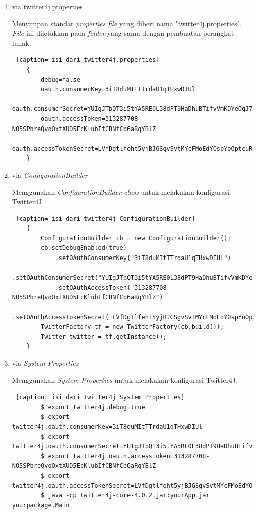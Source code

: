 \begin{enumerate}
	\item via twitter4j.properties
	
	Menyimpan standar \textit{properties} \textit{file} yang diberi nama "twitter4j.properties". \textit{File} ini diletakkan pada \textit{folder} yang sama dengan pembuatan perangkat lunak.
	\begin{lstlisting} [caption= isi dari twitter4j.properties]
	{
		debug=false
		oauth.consumerKey=3iT8duMItTTrdaU1qTHxwDIUl
		oauth.consumerSecret=YUIgJTbQT3i5tYA5RE0L38dPT9HaDhuBTifvVmKDYeOgJ7t313
		oauth.accessToken=313287708-NO5SPbreQvoOxtXUD5EcKlubIfCBNfCb6aRqYBlZ
		oauth.accessTokenSecret=LVfDgtlfeht5yjBJGSgvSvtMYcFMoEdYOspYoOptcuR4i
	}
	\end{lstlisting}
	\item via \textit{ConfigurationBuilder}
	
	Menggunakan \textit{ConfigurationBuilder class} untuk melakukan konfigurasi Twitter4J.
	\begin{lstlisting} [caption= isi dari twitter4j ConfigurationBuilder]
	{
		ConfigurationBuilder cb = new ConfigurationBuilder();
		cb.setDebugEnabled(true)
			.setOAuthConsumerKey("3iT8duMItTTrdaU1qTHxwDIUl")
			.setOAuthConsumerSecret("YUIgJTbQT3i5tYA5RE0L38dPT9HaDhuBTifvVmKDYeOgJ7t313")
			.setOAuthAccessToken("313287708-NO5SPbreQvoOxtXUD5EcKlubIfCBNfCb6aRqYBlZ")
			.setOAuthAccessTokenSecret("LVfDgtlfeht5yjBJGSgvSvtMYcFMoEdYOspYoOptcuR4i");
		TwitterFactory tf = new TwitterFactory(cb.build());
		Twitter twitter = tf.getInstance();
	}
	\end{lstlisting}
	\item via \textit{System Properties}
	
	Menggunakan \textit{System Properties} untuk melakukan konfigurasi Twitter4J.
	\begin{lstlisting} [caption= isi dari twitter4j System Properties]
		$ export twitter4j.debug=true
		$ export twitter4j.oauth.consumerKey=3iT8duMItTTrdaU1qTHxwDIUl
		$ export twitter4j.oauth.consumerSecret=YUIgJTbQT3i5tYA5RE0L38dPT9HaDhuBTifvVmKDYeOgJ7t313
		$ export twitter4j.oauth.accessToken=313287708-NO5SPbreQvoOxtXUD5EcKlubIfCBNfCb6aRqYBlZ
		$ export twitter4j.oauth.accessTokenSecret=LVfDgtlfeht5yjBJGSgvSvtMYcFMoEdYOspYoOptcuR4i
		$ java -cp twitter4j-core-4.0.2.jar:yourApp.jar yourpackage.Main
	\end{lstlisting}
\end{enumerate}

